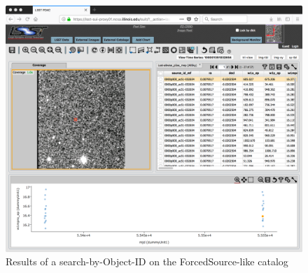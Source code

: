 \begin{figure}
  \includegraphics[width=\linewidth]{lsp-00-15/step3d-lightCurve-results.png}
  \caption{Results of a search-by-Object-ID on the ForcedSource-like catalog}
  \label{fig:lsp-00-15-lightCurve-results}
\end{figure}

